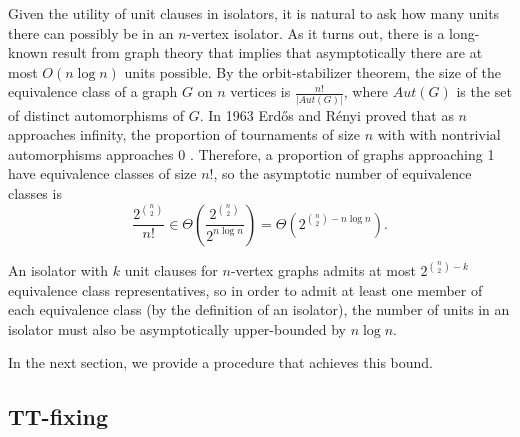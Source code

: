\documentclass[conference]{IEEEtran}
\begin{document}

Given the utility of unit clauses in isolators, it is natural to ask how many units there can possibly be in an $n$-vertex isolator. As it turns out, there is a long-known result from graph theory that implies that asymptotically there are at most $O(n\log n)$ units possible. By the orbit-stabilizer theorem, the size of the equivalence class of a graph $G$ on $n$ vertices is $\frac{n!}{|Aut(G)|}$, where $Aut(G)$ is the set of distinct automorphisms of $G$. In 1963 Erd\H{o}s and R{\'e}nyi proved that as $n$ approaches infinity, the proportion of tournaments of size $n$ with with nontrivial automorphisms approaches 0 \cite{ref_asymmetric}. Therefore, a proportion of graphs approaching 1 have equivalence classes of size $n!$, so the asymptotic number of equivalence classes is
\[
\frac{2^{n \choose 2}}{n!} \in \Theta(\frac{2^{n \choose 2}}{2^{n\log n}}) = \Theta(2^{{n \choose 2} - n\log n}).
\]

An isolator with $k$ unit clauses for $n$-vertex graphs admits at most $2^{{n \choose 2} - k}$ equivalence class representatives, so in order to admit at least one member of each equivalence class (by the definition of an isolator), the number of units in an isolator must also be asymptotically upper-bounded by $n \log n$.

In the next section, we provide a procedure that achieves this bound.

\subsection{TT-fixing}
\end{document}
